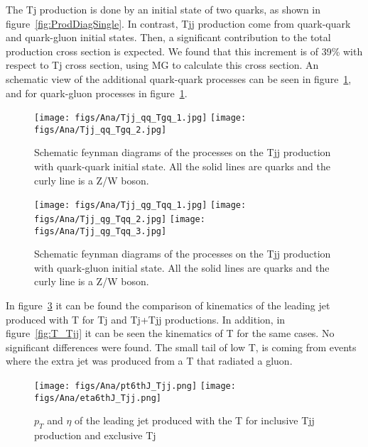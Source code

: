 The Tj production is done by an initial state of two quarks, as shown in figure~\ref{fig:ProdDiagSingle}. In contrast, Tjj production come from quark-quark and quark-gluon initial states. Then, a significant contribution to the total production cross section is expected. We found that this increment is of 39\% with respect to Tj cross section, using MG to calculate this cross section. An schematic view of the additional quark-quark processes can be seen in figure~\ref{fig:qqTjj}, and for quark-gluon processes in figure~\ref{fig:qqTjj}.

\begin{figure}[!hbtp]
  \begin{center}
    \texttt{[image: figs/Ana/Tjj\_qq\_Tgq\_1.jpg]}
    \texttt{[image: figs/Ana/Tjj\_qq\_Tgq\_2.jpg]}
    \caption{Schematic feynman diagrams of the processes on the Tjj production with quark-quark initial state. All the solid lines are quarks and the curly line is a Z/W boson.}
    \label{fig:qqTjj}
  \end{center}
\end{figure}

\begin{figure}[!hbtp]
  \begin{center}
    \texttt{[image: figs/Ana/Tjj\_qg\_Tqq\_1.jpg]}
    \texttt{[image: figs/Ana/Tjj\_qg\_Tqq\_2.jpg]}
    \texttt{[image: figs/Ana/Tjj\_qg\_Tqq\_3.jpg]}
    \caption{Schematic feynman diagrams of the processes on the Tjj production with quark-gluon initial state. All the solid lines are quarks and the curly line is a Z/W boson.}
    \label{fig:qgTjj}
  \end{center}
\end{figure}

In figure~\ref{fig:6thJ_Tjj} it can be found the comparison of kinematics of the leading jet produced with T for Tj and Tj+Tjj productions. In addition, in figure~\ref{fig:T_Tjj} it can be seen the kinematics of T for the same cases. No significant differences were found. The small tail of low \pt T, is coming from events where the extra jet was produced from a T that radiated a gluon. 

\begin{figure}[!hbtp]
  \begin{center}
    \texttt{[image: figs/Ana/pt6thJ\_Tjj.png]}
    \texttt{[image: figs/Ana/eta6thJ\_Tjj.png]}
    \caption{$p_{T}$ and $\eta$ of the leading jet produced with the T for inclusive Tjj production and exclusive Tj}
    \label{fig:6thJ_Tjj}
  \end{center}
\end{figure}

